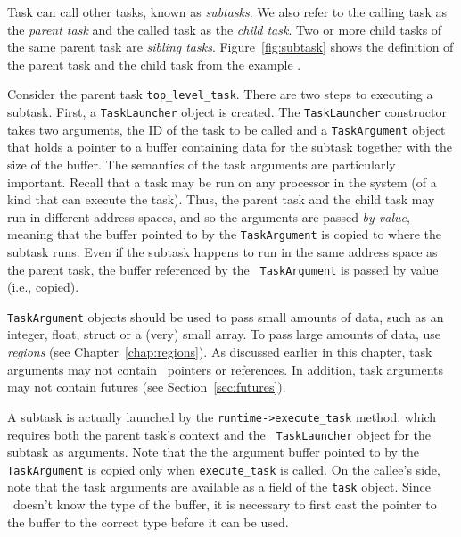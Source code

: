 Task can call other tasks, known as {\em subtasks}.  We also refer to
the calling task as the {\em parent task} and the called task as the
{\em child task}.  Two or more child tasks of the same parent task are
{\em sibling tasks}.  Figure~\ref{fig:subtask} shows the definition of
the parent task and the child task from the example
.

Consider the parent task {\tt top\_level\_task}.  There are two steps
to executing a subtask.  First, a {\tt TaskLauncher} object is
created.  The {\tt TaskLauncher}
constructor takes two arguments, the ID of the task to be called and a
{\tt TaskArgument} object that holds a pointer to a buffer containing
data for the subtask together with the size of the buffer.  The
semantics of the task arguments are particularly important.  Recall
that a task may be run on any processor in the system (of a kind that
can execute the task).  Thus, the parent task and the child task may
run in different address spaces, and so the arguments are passed
{\em by value}, meaning that the buffer pointed to by the {\tt TaskArgument} is
copied to where the subtask runs.  Even if the subtask happens to run in the
same address space as the parent task, the buffer referenced by the {\tt
  TaskArgument} is passed by value (i.e., copied).  

{\tt TaskArgument} objects should be used to pass small amounts of data,
such as an integer, float, struct or a (very) small array.  To pass large amounts of
data, use {\em regions} (see Chapter~\ref{chap:regions}).  As
discussed earlier in this chapter, task arguments may not contain
\Cpp\ pointers or references.  In addition, task arguments may not contain
futures (see Section~\ref{sec:futures}).

A subtask is actually launched by the {\tt runtime->execute\_task}
method, which requires both the parent task's context and the {\tt
  TaskLauncher} object for the subtask as arguments.  Note that the
the argument buffer pointed to by the {\tt TaskArgument} is copied
only when {\tt execute\_task} is called. On the callee's side, note
that the task arguments are available as a field of the {\tt task}
object. Since \Cpp\ doesn't know the type of the buffer, it is
necessary to first cast the pointer to the buffer to the correct type
before it can be used.

